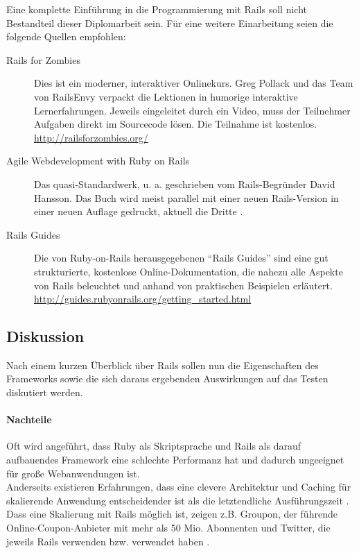Eine komplette Einführung in die Programmierung mit Rails soll nicht Bestandteil dieser Diplomarbeit sein. Für eine weitere Einarbeitung seien die folgende Quellen empfohlen:
\begin{description}
 \item[Rails for Zombies] Dies ist ein moderner, interaktiver Onlinekurs. Greg Pollack und das Team von RailsEnvy verpackt die Lektionen in humorige interaktive Lernerfahrungen. Jeweils eingeleitet durch ein Video, muss der Teilnehmer Aufgaben direkt im Sourcecode lösen. Die Teilnahme ist kostenlos.\\
 \url{http://railsforzombies.org/}
 \item[Agile Webdevelopment with Ruby on Rails] Das quasi-Standardwerk, u. a. geschrieben vom Rails-Begründer David Hansson. Das Buch wird meist parallel mit einer neuen Rails-Version in einer neuen Auflage gedruckt, aktuell die Dritte \citep{ruby_agile_2009}.
 \item[Rails Guides] Die von Ruby-on-Rails herausgegebenen "`Rails Guides"' sind eine gut strukturierte, kostenlose Online-Dokumentation, die nahezu alle Aspekte von Rails beleuchtet und anhand von praktischen Beispielen erläutert.\\
 \url{http://guides.rubyonrails.org/getting_started.html}
 \end{description}



\subsection{Diskussion}
Nach einem kurzen Überblick über Rails sollen nun die Eigenschaften des Frameworks sowie die sich daraus ergebenden Auswirkungen auf das Testen diskutiert werden.

\paragraph{Nachteile}

Oft wird angeführt, dass Ruby als Skriptsprache und Rails als darauf aufbauendes Framework eine schlechte Performanz hat und dadurch ungeeignet für große Webanwendungen ist.\\
Anderseits existieren Erfahrungen, dass eine clevere Architektur und Caching für skalierende Anwendung entscheidender ist als die letztendliche Ausführungszeit \citep{kirk_haines_ruby_2010}.
Dass eine Skalierung mit Rails möglich ist, zeigen z.B. Groupon, der führende Online-Coupon-Anbieter mit mehr als 50 Mio. Abonnenten und Twitter, die jeweils Rails verwenden bzw. verwendet haben \citep{ruby_on_rails_2011}.

